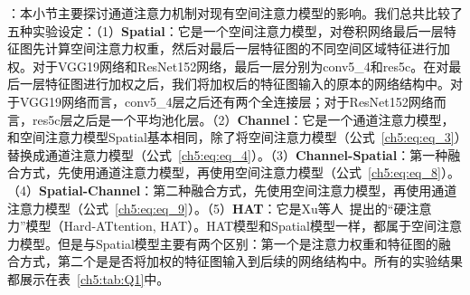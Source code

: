 \textbf{}：本小节主要探讨通道注意力机制对现有空间注意力模型的影响。我们总共比较了五种实验设定：（1）\textbf{Spatial}：它是一个空间注意力模型，对卷积网络最后一层特征图先计算空间注意力权重，然后对最后一层特征图的不同空间区域特征进行加权。对于VGG19网络和ResNet152网络，最后一层分别为conv5\_4和res5c。在对最后一层特征图进行加权之后，我们将加权后的特征图输入的原本的网络结构中。对于VGG19网络而言，conv5\_4层之后还有两个全连接层；对于ResNet152网络而言，res5c层之后是一个平均池化层。（2）\textbf{Channel}：它是一个通道注意力模型，和空间注意力模型Spatial基本相同，除了将空间注意力模型（公式~\eqref{ch5:eq:eq_3}）替换成通道注意力模型（公式~\eqref{ch5:eq:eq_4}）。（3）\textbf{Channel-Spatial}：第一种融合方式，先使用通道注意力模型，再使用空间注意力模型（公式~\eqref{ch5:eq:eq_8}）。（4）\textbf{Spatial-Channel}：第二种融合方式，先使用空间注意力模型，再使用通道注意力模型（公式~\eqref{ch5:eq:eq_9}）。（5）\textbf{HAT}：它是Xu等人~\cite{xu2015show}提出的“硬注意力”模型（Hard-ATtention, HAT）。HAT模型和Spatial模型一样，都属于空间注意力模型。但是与Spatial模型主要有两个区别：第一个是注意力权重和特征图的融合方式，第二个是是否将加权的特征图输入到后续的网络结构中。所有的实验结果都展示在表~\ref{ch5:tab:Q1}中。

